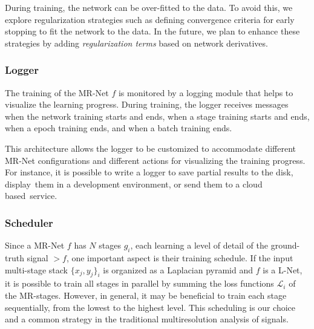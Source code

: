 
During training, the network can be over-fitted to the data. To avoid this, we explore regularization strategies such as defining convergence criteria for early stopping to fit the network to the data. In the future, we plan to enhance these strategies by adding \textit{regularization terms} based on network derivatives. 



\subsubsection{Logger}

The training of the MR-Net $f$ is monitored by a logging module that helps to visualize the learning progress. During training, the logger receives messages when the network training starts and ends, when a stage training starts and ends, when a epoch training ends, and when a batch training ends. 

This architecture allows the logger to be customized to accommodate different MR-Net configurations and different actions for visualizing the training progress. For instance, it is possible to write a logger to save partial results to the disk, display~them in a development environment, or send them to a cloud based~service.


\subsubsection{Scheduler}

Since a MR-Net $f$ has $N$ stages $g_i$, each learning a level of detail of the ground-truth signal $\gt{f}$, one important aspect is their training schedule. 
If the input multi-stage stack $\{x_j, y_j\}_i$ is organized as a Laplacian pyramid and $f$ is a L-Net, it is possible to train all stages in parallel by summing the loss functions $\mathcal{L}_i$ of the MR-stages. However, in general, it may be beneficial to train each stage sequentially, from the lowest to the highest level. This scheduling is our choice and a common strategy in the traditional multiresolution analysis of signals.

